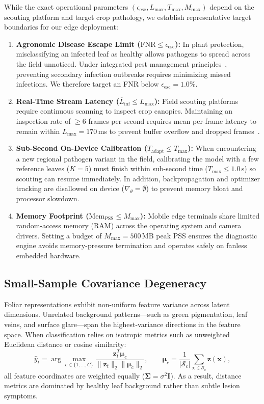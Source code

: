 \documentclass[preprint,12pt]{elsarticle}
\begin{document}
While the exact operational parameters $(\epsilon_{\text{esc}}, L_{\max}, T_{\max}, M_{\max})$ depend on the scouting platform and target crop pathology, we establish representative target boundaries for our edge deployment:
\begin{enumerate}
    \item \textbf{Agronomic Disease Escape Limit ($\text{FNR} \le \epsilon_{\text{esc}}$):} In plant protection, misclassifying an infected leaf as healthy allows pathogens to spread across the field unnoticed. Under integrated pest management principles~\cite{richard2022control}, preventing secondary infection outbreaks requires minimizing missed infections. We therefore target an FNR below $\epsilon_{\text{esc}} = 1.0\%$.
    \item \textbf{Real-Time Stream Latency ($\overline{L}_{\text{inf}} \le L_{\max}$):} Field scouting platforms require continuous scanning to inspect crop canopies. Maintaining an inspection rate of $\ge 6$ frames per second requires mean per-frame latency to remain within $L_{\max} = 170$\,ms to prevent buffer overflow and dropped frames~\cite{sharif2026real}.
    \item \textbf{Sub-Second On-Device Calibration ($T_{\text{adapt}} \le T_{\max}$):} When encountering a new regional pathogen variant in the field, calibrating the model with a few reference leaves ($K=5$) must finish within sub-second time ($T_{\max} \le 1.0$\,s) so scouting can resume immediately. In addition, backpropagation and optimizer tracking are disallowed on device ($\nabla_\theta = \emptyset$) to prevent memory bloat and processor slowdown.
    \item \textbf{Memory Footprint ($\text{Mem}_{\text{PSS}} \le M_{\max}$):} Mobile edge terminals share limited random-access memory (RAM) across the operating system and camera drivers. Setting a budget of $M_{\max} = 500$\,MB peak PSS ensures the diagnostic engine avoids memory-pressure termination and operates safely on fanless embedded hardware.
\end{enumerate}

\subsection{Small-Sample Covariance Degeneracy}
\label{sec:covariance_degeneracy}
Foliar representations exhibit non-uniform feature variance across latent dimensions. Unrelated background patterns---such as green pigmentation, leaf veins, and surface glare---span the highest-variance directions in the feature space. When classification relies on isotropic metrics such as unweighted Euclidean distance or cosine similarity:
\begin{equation}
    \hat{y}_t = \arg\max_{c \in \{1, \dots, C\}} \frac{\mathbf{z}_t^T \boldsymbol{\mu}_c}{\|\mathbf{z}_t\|_2 \|\boldsymbol{\mu}_c\|_2}, \qquad \boldsymbol{\mu}_c = \frac{1}{|\mathcal{S}_c|}\sum_{\mathbf{x} \in \mathcal{S}_c} \mathbf{z}(\mathbf{x}),
    \label{eq:isotropic_cosine}
\end{equation}
all feature coordinates are weighted equally ($\mathbf{\Sigma} = \sigma^2 \mathbf{I}$). As a result, distance metrics are dominated by healthy leaf background rather than subtle lesion symptoms.
\end{document}
